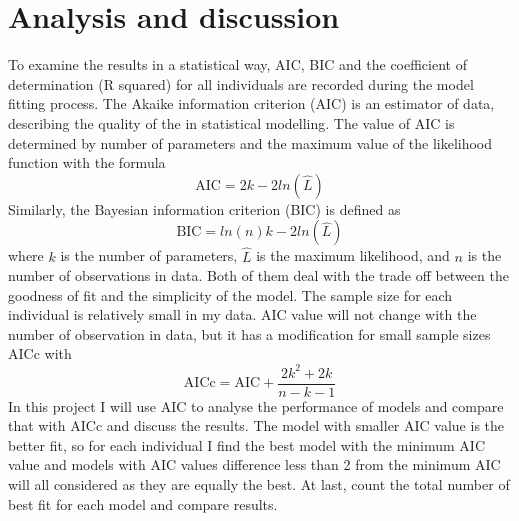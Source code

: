\documentclass{article}[11pt,a4,twosided,doublespacing,titlepagenumber=on,numbers=endperiod]
\begin{document}
\section{Analysis and discussion}
To examine the results in a statistical way, AIC, BIC and the coefficient of determination (R squared) for all individuals are recorded during the model fitting process. The Akaike information criterion (AIC) is an estimator of data, describing the quality of the in statistical modelling. The value of AIC is determined by number of parameters and the maximum value of the likelihood function with the formula
\begin{equation}
    \text{AIC} = 2k - 2 ln(\widehat{L}) 
\end{equation}
\noindent
Similarly, the Bayesian information criterion (BIC) is defined as
\begin{equation}
    \text{BIC} = ln(n)k - 2 ln(\widehat{L}) 
\end{equation}
where $k$ is the number of parameters, $\widehat{L}$ is the maximum likelihood, and $n$ is the number of observations in data. Both of them deal with the trade off between the goodness of fit and the simplicity of the model. The sample size for each individual is relatively small in my data. AIC value will not change with the number of observation in data, but it has a modification for small sample sizes AICc with
\begin{equation}
    \text{AICc} = \text{AIC} + \frac{2k^2 + 2k}{n - k -1}
\end{equation}
In this project I will use AIC to analyse the performance of models and compare that with AICc and discuss the results. The model with smaller AIC value is the better fit, so for each individual I find the best model with the minimum AIC value and models with AIC values difference less than 2 from the minimum AIC will all considered as they are equally the best. At last, count the total number of best fit for each model and compare results.
\end{document}
